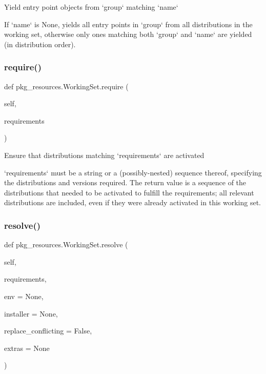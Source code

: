 \begin{DoxyVerb}Yield entry point objects from `group` matching `name`

If `name` is None, yields all entry points in `group` from all
distributions in the working set, otherwise only ones matching
both `group` and `name` are yielded (in distribution order).
\end{DoxyVerb}
 \mbox{\label{classpkg__resources_1_1_working_set_a1c2434f098e08c20314935fddad8426b}} 
\subsubsection{\texorpdfstring{require()}{require()}}
{\footnotesize\ttfamily def pkg\+\_\+resources.\+Working\+Set.\+require (\begin{DoxyParamCaption}\item[{}]{self,  }\item[{}]{requirements }\end{DoxyParamCaption})}

\begin{DoxyVerb}Ensure that distributions matching `requirements` are activated

`requirements` must be a string or a (possibly-nested) sequence
thereof, specifying the distributions and versions required.  The
return value is a sequence of the distributions that needed to be
activated to fulfill the requirements; all relevant distributions are
included, even if they were already activated in this working set.
\end{DoxyVerb}
 \mbox{\label{classpkg__resources_1_1_working_set_a38c13850cc73d319b4bcf47592132941}} 
\subsubsection{\texorpdfstring{resolve()}{resolve()}}
{\footnotesize\ttfamily def pkg\+\_\+resources.\+Working\+Set.\+resolve (\begin{DoxyParamCaption}\item[{}]{self,  }\item[{}]{requirements,  }\item[{}]{env = {\ttfamily None},  }\item[{}]{installer = {\ttfamily None},  }\item[{}]{replace\+\_\+conflicting = {\ttfamily False},  }\item[{}]{extras = {\ttfamily None} }\end{DoxyParamCaption})}

